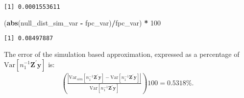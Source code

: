 \documentclass[
  12pt,
  leqno]{article}
\newenvironment{Shaded}{\begin{snugshade}}{\end{snugshade}}
\newcommand{\ControlFlowTok}[1]{\textcolor[rgb]{0.13,0.29,0.53}{\textbf{#1}}}
\newcommand{\DataTypeTok}[1]{\textcolor[rgb]{0.13,0.29,0.53}{#1}}
\newcommand{\DecValTok}[1]{\textcolor[rgb]{0.00,0.00,0.81}{#1}}
\newcommand{\KeywordTok}[1]{\textcolor[rgb]{0.13,0.29,0.53}{\textbf{#1}}}
\newcommand{\NormalTok}[1]{#1}
\newcommand{\OperatorTok}[1]{\textcolor[rgb]{0.81,0.36,0.00}{\textbf{#1}}}
\newcommand{\StringTok}[1]{\textcolor[rgb]{0.31,0.60,0.02}{#1}}
\DeclareMathOperator{\1}{\mathbbm{1}}
\begin{document}
\begin{Shaded}
\end{Shaded}

\begin{verbatim}
[1] 0.0001553611
\end{verbatim}

\begin{Shaded}
\begin{Highlighting}[]
\NormalTok{(}\KeywordTok{abs}\NormalTok{(null\_dist\_sim\_var }\OperatorTok{{-}}\StringTok{ }\NormalTok{fpc\_var)}\OperatorTok{/}\NormalTok{fpc\_var) }\OperatorTok{*}\StringTok{ }\DecValTok{100}
\end{Highlighting}
\end{Shaded}

\begin{verbatim}
[1] 0.08497887
\end{verbatim}

\normalsize

The error of the simulation based approximation, expressed as a
percentage of
\(\mathrm{Var}\left[n_1^{-1} \mathbf{Z}^{\prime} \mathbf{y}\right]\) is:
\begin{align*}
\left(\frac{\left|\mathrm{Var}_{sim}\left[n_1^{-1} \mathbf{Z}^{\prime} \mathbf{y}\right] - \mathrm{Var}\left[n_1^{-1} \mathbf{Z}^{\prime} \mathbf{y}\right]\right|}{\mathrm{Var}\left[n_1^{-1} \mathbf{Z}^{\prime} \mathbf{y}\right]}\right) 100 = 0.5318 \%.
\end{align*}
\end{document}
